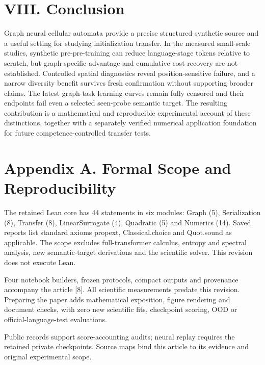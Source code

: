 \documentclass[10pt,letterpaper,twocolumn]{article}
\begin{document}
\section*{VIII. Conclusion}
Graph neural cellular automata provide a precise structured synthetic source and a useful setting for studying initialization transfer. In the measured small-scale studies, synthetic pre-pre-training can reduce language-stage tokens relative to scratch, but graph-specific advantage and cumulative cost recovery are not established. Controlled spatial diagnostics reveal position-sensitive failure, and a narrow diversity benefit survives fresh confirmation without supporting broader claims. The latest graph-task learning curves remain fully censored and their endpoints fail even a selected seen-probe semantic target. The resulting contribution is a mathematical and reproducible experimental account of these distinctions, together with a separately verified numerical application foundation for future competence-controlled transfer tests.

\section*{Appendix A. Formal Scope and Reproducibility}
The retained Lean core has 44 statements in six modules: Graph (5), Serialization (8), Transfer (8), LinearSurrogate (4), Quadratic (5) and Numerics (14). Saved reports list standard axioms propext, Classical.choice and Quot.sound as applicable. The scope excludes full-transformer calculus, entropy and spectral analysis, new semantic-target derivations and the scientific solver. This revision does not execute Lean.

Four notebook builders, frozen protocols, compact outputs and provenance accompany the article [8]. All scientific measurements predate this revision. Preparing the paper adds mathematical exposition, figure rendering and document checks, with zero new scientific fits, checkpoint scoring, OOD or official-language-test evaluations.

Public records support score-accounting audits; neural replay requires the retained private checkpoints. Source maps bind this article to its evidence and original experimental scope.

\clearpage\onecolumn
\end{document}

